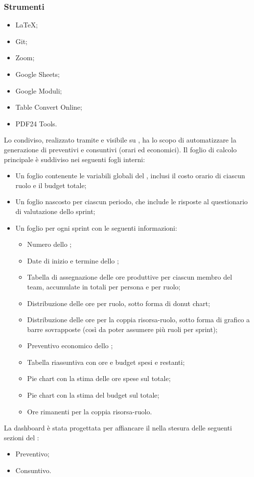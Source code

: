 \subsubsection{Strumenti}
\IntroStrumenti
\begin{itemize}
  \item LaTeX;
  \item Git;
  \item Zoom;
  \item Google Sheets;
  \item Google Moduli;
  \item Table Convert Online;
  \item PDF24 Tools.
\end{itemize}

Lo  condiviso, realizzato tramite  e visibile su , ha lo scopo di automatizzare la generazione di preventivi e consuntivi (orari ed economici). Il foglio di calcolo principale è suddiviso nei seguenti fogli interni:
\begin{itemize}
  \item Un foglio contenente le variabili globali del \PdP, inclusi il costo orario di ciascun ruolo e il budget totale;
  \item Un foglio nascosto per ciascun periodo, che include le risposte al questionario di valutazione dello sprint;
  \item Un foglio per ogni sprint con le seguenti informazioni:
  \begin{itemize}
    \item Numero dello ;
    \item Date di inizio e termine dello ;
    \item Tabella di assegnazione delle ore produttive per ciascun membro del team, accumulate in totali per persona e per ruolo;
    \item Distribuzione delle ore per ruolo, sotto forma di donut chart;
    \item Distribuzione delle ore per la coppia risorsa-ruolo, sotto forma di grafico a barre sovrapposte (così da poter assumere più ruoli per sprint);
    \item Preventivo economico dello ;
    \item Tabella riassuntiva con ore e budget spesi e restanti;
    \item Pie chart con la stima delle ore spese sul totale;
    \item Pie chart con la stima del budget sul totale;
    \item Ore rimanenti per la coppia risorsa-ruolo.
  \end{itemize}
\end{itemize}
\vspace{0.5\baselineskip}
\par La dashboard è stata progettata per affiancare il \Responsabile{} nella stesura delle seguenti sezioni del \PdP:
\begin{itemize}
  \item Preventivo;
  \item Consuntivo.
\end{itemize}

